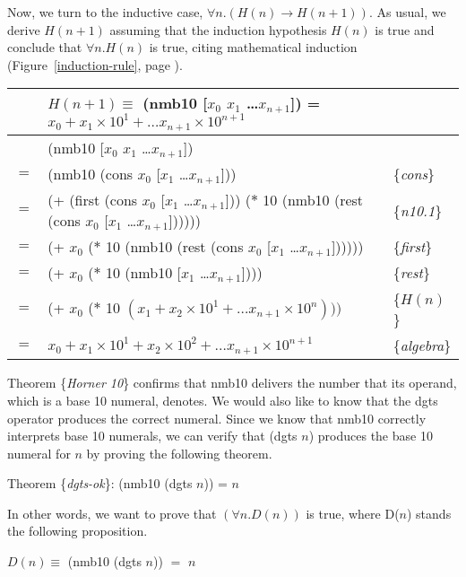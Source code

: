 Now, we turn to the inductive case, $\forall n. (H(n) \rightarrow H(n+1))$.
As usual, we derive $H(n+1)$ assuming that the induction hypothesis $H(n)$ is true
and conclude that $\forall n.H(n)$ is true,
citing mathematical induction
(Figure~\ref{induction-rule}, page \pageref{induction-rule}).

\begin{center}
\begin{tabular}{lll}
 & $H(n+1) \equiv$
(nmb10 [$x_0$ $x_1$ \dots $x_{n+1}$]) =
$x_0 + x_1 \times 10^1 +  \dots x_{n+1} \times 10^{n+1}$ & \\
\hline
    & (nmb10 [$x_0$ $x_1$ \dots $x_{n+1}$])           & \\
$=$ & (nmb10 (cons $x_0$ [$x_1$ \dots $x_{n+1}$]))  & \{\emph{cons}\}\\
$=$ & (+ (first (cons $x_0$ [$x_1$ \dots $x_{n+1}$])) ($*$ 10 (nmb10 (rest (cons $x_0$ [$x_1$ \dots $x_{n+1}$])))))  & \{\emph{n10.1}\} \\
$=$ & (+ $x_0$ ($*$ 10 (nmb10 (rest (cons $x_0$ [$x_1$ \dots $x_{n+1}$])))))      & \{\emph{first}\} \\
$=$ & (+ $x_0$ ($*$ 10 (nmb10 [$x_1$ \dots $x_{n+1}$])))                          & \{\emph{rest}\}\\
$=$ & (+ $x_0$ ($*$ 10 $(x_1 + x_2 \times 10^1 + \dots x_{n+1} \times 10^{n})))$  & \{$H(n)$\}\\
$=$ & $x_0 + x_1 \times 10^1 + x_2 \times 10^2 + \dots x_{n+1} \times 10^{n+1}$   & \{\emph{algebra}\} \\
\end{tabular}
\end{center}

Theorem \{\emph{Horner 10}\} confirms that nmb10 delivers the
number that its operand, which is a base 10 numeral, denotes.
We would also like to know that the dgts operator
produces the correct numeral.
Since we know that nmb10 correctly interprets base 10 numerals,
we can verify that (dgts $n$) produces the base 10 numeral for $n$
by proving the following theorem.
\begin{center}
\label{dgts-ok}
Theorem \{\emph{dgts-ok}\}:
(nmb10 (dgts $n$)) = $n$
\end{center}

In other words, we want to prove that
$(\forall n.D(n))$ is true, where D($n$) stands the following proposition.
\begin{center}
$D(n) \equiv$ (nmb10 (dgts $n$)) $=$ $n$
\end{center}

